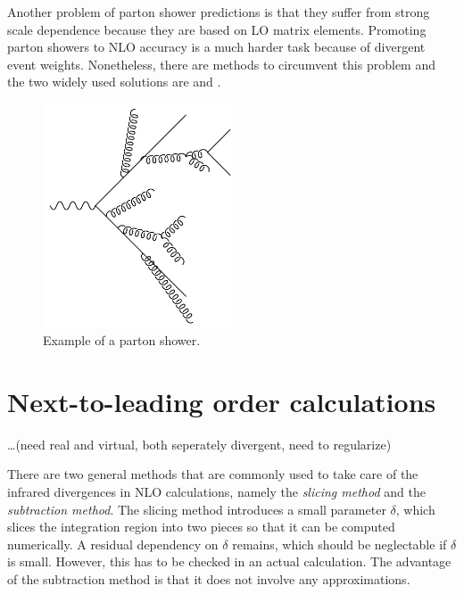 Another problem of parton shower predictions is that they suffer from strong scale dependence because they are based on LO matrix elements.
Promoting parton showers to NLO accuracy is a much harder task because of divergent event weights.
Nonetheless, there are methods to circumvent this problem and the two widely used solutions are \mcatnlo{} \cite{mcatnlo} and \powheg{} \cite{powheg_a,powheg_b,powheg_c}.
%
\begin{figure}[]
	\includegraphics[width=0.5\textwidth]{images/partonshower.pdf}
	\caption{Example of a parton shower.}
	\label{fig:partonshower}
\end{figure}
%
%
\section{Next-to-leading order calculations}
\label{sec:nlo_calculations}
\ldots(need real and virtual, both seperately divergent, need to regularize)


There are two general methods that are commonly used to take care of the infrared divergences in NLO calculations, namely the \textit{slicing method} and the \textit{subtraction method}.
The slicing method introduces a small parameter $\delta$, which slices the integration region into two pieces so that it can be computed numerically.
A residual dependency on $\delta$ remains, which should be neglectable if $\delta$ is small.
However, this has to be checked in an actual calculation.
The advantage of the subtraction method is that it does not involve any approximations.

